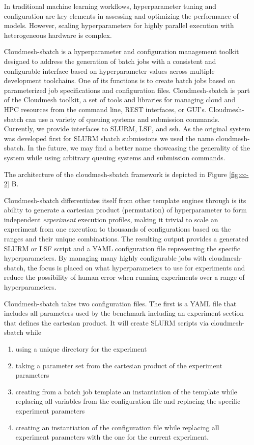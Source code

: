 \documentclass[utf8]{FrontiersinVancouver} %
\begin{document}
In traditional machine learning workflows, hyperparameter tuning and
configuration are key elements in assessing and optimizing the
performance of models. However, scaling hyperparameters for highly
parallel execution with heterogeneous hardware is complex.

Cloudmesh-sbatch is a hyperparameter and configuration management
toolkit designed to address the generation of batch jobs with a
consistent and configurable interface based on hyperparameter values
across multiple development toolchains. One of its functions is to
create batch jobs based on parameterized job specifications and
configuration files.  Cloudmesh-sbatch is part of the Cloudmesh
toolkit, a set of tools and libraries for managing cloud and HPC
resources from the command line, REST interfaces, or GUI's.
Cloudmesh-sbatch can use a variety of
queuing systems and submission commands. Currently, we provide
interfaces to SLURM, LSF, and ssh. As the original system was
developed first for SLURM sbatch submissions we used the name
cloudmesh-sbatch. In the future, we may find a better name showcasing the
generality of the system while using arbitrary queuing systems and
submission commands.

The architecture of the cloudmesh-sbatch framework is depicted in
Figure \ref{fig:cc-2} B.

Cloudmesh-sbatch differentiates itself from other template
engines through is its ability to generate a cartesian product (permutation)
of hyperparameter to form independent {\it experiment} execution profiles,
making it trivial to scale an experiment from one execution to
thousands of configurations based on the ranges and their unique
combinations.  The resulting output provides a generated SLURM or LSF
script and a YAML configuration file representing the specific
hyperparameters.  By managing many highly configurable jobs with
cloudmesh-sbatch, the focus is placed on what hyperparameters to use
for experiments and reduce the possibility of human error when running
experiments over a range of hyperparameters.

Cloudmesh-sbatch takes two configuration files. The first is a YAML
file that includes all parameters used by the benchmark including an
experiment section that defines the cartesian product. It will create
SLURM scripts via cloudmesh-sbatch while

\begin{enumerate}
  \item using a unique directory for the experiment
  \item taking a parameter set from the cartesian product
    of the experiment parameters
  \item creating from a batch job template an instantiation of the
    template while replacing all variables from the configuration file
    and replacing the specific experiment parameters
  \item creating an instantiation of the configuration file while
    replacing all experiment parameters with the one for the current
    experiment.
\end{enumerate}
\end{document}
